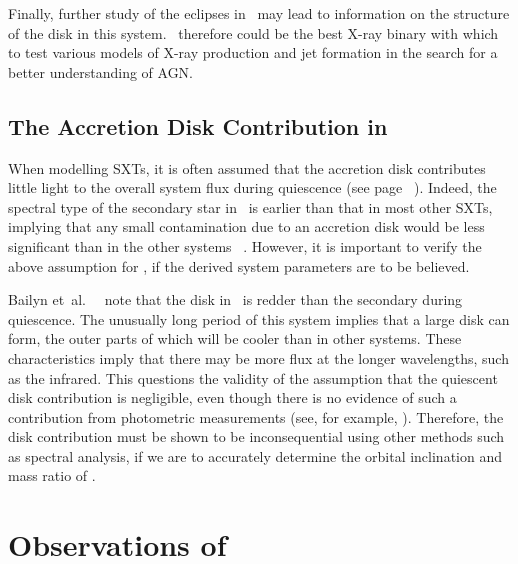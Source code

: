 Finally, further study of the eclipses in \groj\ may lead to information on the
structure of the disk in this system. \groj\ therefore could be the best X-ray binary with which to test
various models of X-ray production and jet formation in the search for
a better understanding of AGN.\@


\subsection{The Accretion Disk Contribution in \groj}\label{cha:GROJ1655-40:sec:IntroductionToJ1655:subsec:TheAccretionDisk}

When modelling SXTs, it is often assumed that the accretion disk
contributes little light to the overall system flux during
quiescence (see page~%
\pageref{cha:InfraredDataReductionTechniques:sec:InfraredAstronomy:subsubsec:InfraredSpectroscopy}%
). Indeed, the spectral type of the secondary star in \groj\ is earlier than that in most other SXTs, implying that any small
contamination due to an accretion disk would be less significant than
in the other systems~\cite{BeerPodsiadlowski:2001}%
. However, it is important to verify the above assumption for \groj, if the derived
system parameters are to be believed. %

\vspace{\myparskip}

Bailyn et~al.\ %
\citeyear{BailynJain_et_al.:1998}%
\ note that the disk in \groj\ is redder than the secondary during
quiescence. The unusually long period of this system implies that a
large disk can form, the outer parts of which will be cooler than in
other systems. These characteristics imply that there may
be more flux at the longer wavelengths, such as the infrared. This questions the validity of the
assumption that the quiescent disk contribution is negligible, even though there is no evidence of such a contribution from photometric measurements (see, for example, %
%
). Therefore, the
disk contribution must be shown to be inconsequential using other
methods such as spectral analysis, if we are to accurately determine
the orbital inclination and mass ratio of \groj. %


\section{Observations of \groj}\label{cha:GROJ1655-40:sec:ObservationsOfJ1655}

